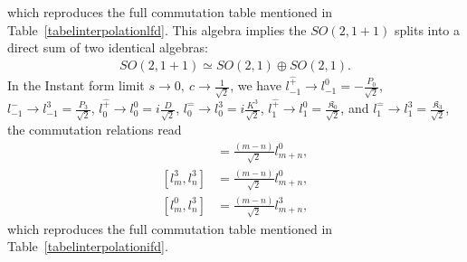 \documentclass[%
 reprint,
superscriptaddress,
 amsmath,amssymb,
 aps,
]{revtex4-2}
\begin{document}
which reproduces the full commutation table mentioned in Table~\ref {tabelinterpolationlfd}. This algebra implies the $SO(2,1+1)$ splits into a direct sum of two identical algebras:
\begin{align}
    SO(2,1+1)\simeq SO(2,1)\oplus SO(2,1).
\end{align}
In the Instant form limit $s\rightarrow0,~c\rightarrow\frac{1}{\sqrt{2}}$, we have  $l^{\hat{+}}_{-1}\rightarrow l^{0}_{-1}=-\frac{P_{0}}{\sqrt{2}}$, $l^{\hat{-}}_{-1}\rightarrow l^{3}_{-1}= \frac{P_{3}}{\sqrt{2}}$, $l^{\hat{+}}_{0}\rightarrow l^{0}_{0}=i\frac{D}{\sqrt{2}}$, 
 $l^{\hat{-}}_{0}\rightarrow l^{3}_{0}= i\frac{K^{3}}{\sqrt{2}}$, $l^{\hat{+}}_{1}\rightarrow l^{0}_{1}= \frac{\mathfrak{K}_{0}}{\sqrt{2}}$, and $l^{\hat{-}}_{1}\rightarrow l^{3}_{1}= \frac{\mathfrak{K}_{3}}{\sqrt{2}}$, the commutation relations read
 \begin{align}
    [l^{0}_m,l^{0}_n]&=\frac{(m-n)}{\sqrt{2}}l^{0}_{m+n},\\
    [l^{3}_m,l^{3}_n]&=\frac{(m-n)}{\sqrt{2}}l^{0}_{m+n},\\
    [l^{0}_m,l^{3}_n]&=\frac{(m-n)}{\sqrt{2}}l^{3}_{m+n},
\end{align}
which reproduces the full commutation table mentioned in Table~\ref {tabelinterpolationifd}.
\end{document}
